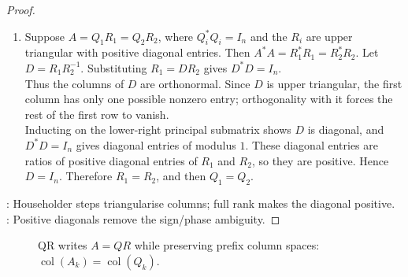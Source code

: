 \begin{theorem}
\begin{proof}
\begin{enumerate}[label=(\roman*)]
Let $V=(U_n\cdots U_1)^*$. Then $A=V\begin{bmatrix}R\\0\end{bmatrix}$, and $V=[Q\ Q']$ gives $A=QR$ with $Q$ orthonormal columns.\\
If $\operatorname{rank}(A)=n$, then $n=\operatorname{rank}(A)=\operatorname{rank}(R)$, so the triangular matrix $R$ is invertible and its nonnegative diagonal entries are positive.
\item
Suppose $A=Q_1R_1=Q_2R_2$, where $Q_i^*Q_i=I_n$ and the $R_i$ are upper triangular with positive diagonal entries. Then $A^*A=R_1^*R_1=R_2^*R_2$. Let $D=R_1R_2^{-1}$. Substituting $R_1=DR_2$ gives $D^*D=I_n$.\\
Thus the columns of $D$ are orthonormal. Since $D$ is upper triangular, the first column has only one possible nonzero entry; orthogonality with it forces the rest of the first row to vanish.\\
Inducting on the lower-right principal submatrix shows $D$ is diagonal, and $D^*D=I_n$ gives diagonal entries of modulus $1$. These diagonal entries are ratios of positive diagonal entries of $R_1$ and $R_2$, so they are positive. Hence $D=I_n$. Therefore $R_1=R_2$, and then $Q_1=Q_2$.
\end{enumerate}
: Householder steps triangularise columns; full rank makes the diagonal positive.\\
: Positive diagonals remove the sign/phase ambiguity.
\end{proof}
\end{theorem}

\begin{figure}[H]
  \centering
  
  \caption{QR writes $A=QR$ while preserving prefix column spaces: $\operatorname{col}(A_k)=\operatorname{col}(Q_k)$.}
  \label{fig:qr-factorization-geometry}
\end{figure}

